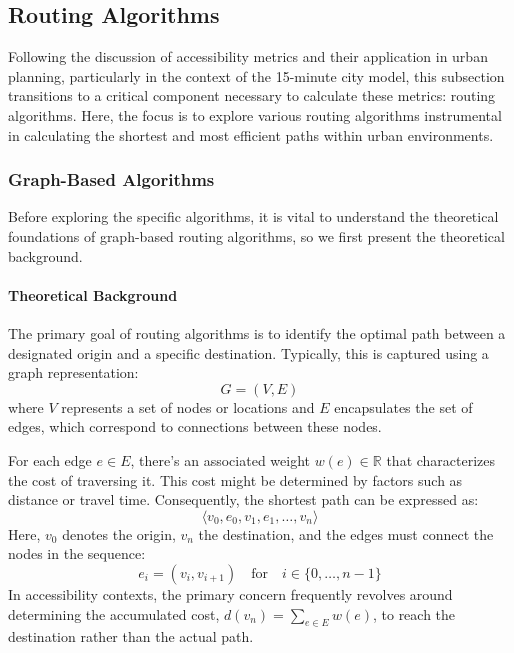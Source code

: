 \subsection{Routing Algorithms}
\label{subsec:routing_algorithms}

Following the discussion of accessibility metrics and their application in urban planning, particularly in the context of the 15-minute city model, this subsection transitions to a critical component necessary to calculate these metrics: routing algorithms.
Here, the focus is to explore various routing algorithms instrumental in calculating the shortest and most efficient paths within urban environments. 

\subsubsection{Graph-Based Algorithms}

Before exploring the specific algorithms, it is vital to understand the theoretical foundations of graph-based routing algorithms, so we first present the theoretical background.

\paragraph{Theoretical Background}

The primary goal of routing algorithms is to identify the optimal path between a designated origin and a specific destination.
Typically, this is captured using a graph representation:
\[ G = (V, E) \]
where $V$ represents a set of nodes or locations and $E$ encapsulates the set of edges, which correspond to connections between these nodes.

For each edge \( e \in E \), there's an associated weight \( w(e) \in \mathbb{R} \) that characterizes the cost of traversing it.
This cost might be determined by factors such as distance or travel time.
Consequently, the shortest path can be expressed as:
\[ \langle v_0, e_0, v_1, e_1, \dots, v_n \rangle \]
Here, \( v_0 \) denotes the origin, \( v_n \) the destination, and the edges must connect the nodes in the sequence:
\[ e_i = (v_i, v_{i+1}) \quad \text{for} \quad i \in \{0, \dots, n-1\} \]
In accessibility contexts, the primary concern frequently revolves around determining the accumulated cost, \( d(v_n) = \sum_{e \in E} w(e) \), to reach the destination rather than the actual path.

